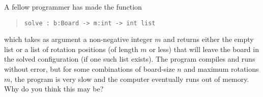 A fellow programmer has made the function
\begin{quote}
  \lstinline{solve : b:Board -> m:int -> int list}
\end{quote}
which takes as argument a non-negative integer $m$ and returns either
the empty list or a list of rotation positions (of length $m$ or less)
that will leave the board in the solved configuration (if one such
list exists).  The program compiles and runs without error, but for
some combinations of board-size $n$ and maximum rotations $m$, the
program is very slow and the computer eventually runs out of
memory. Why do you think this may be?
